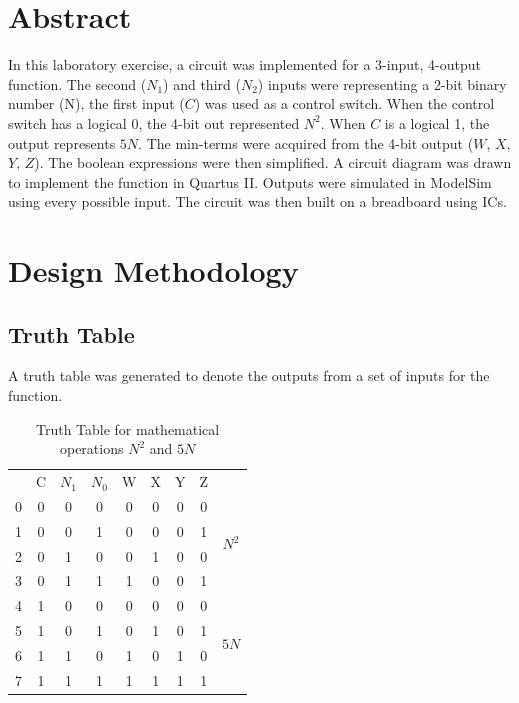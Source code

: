 \documentclass[CMPE]{KGCOEReport}
\begin{document}
\maketitle

\section*{Abstract}
In this laboratory exercise, a circuit was implemented for a 3-input, 4-output function. The second (\(N_1\)) and third (\(N_2\)) inputs were representing a 2-bit binary number (N), the first input (\(C\)) was used as a control switch. When the control switch has a logical 0, the 4-bit out represented \(N^2\). When \(C\) is a logical 1, the output represents \(5N\). The min-terms were acquired from the 4-bit output (\(W\), \(X\), \(Y\), \(Z\)). The boolean expressions were then simplified. A circuit diagram was drawn to implement the function in Quartus II. Outputs were simulated in ModelSim using every possible input. The circuit was then built on a breadboard using ICs.

\section*{Design Methodology}

\subsection*{Truth Table}

A truth table was generated to denote the outputs from a set of inputs for the function.

\begin{table}[h]
\renewcommand{\arraystretch}{1.2}
\setlength{\tabcolsep}{12pt}
\caption{Truth Table for mathematical operations \(N^2\) and \(5N\)}
\begin{center}
\begin{tabular}{c|c|c|c||c|c|c|c|c}
\cline{2-8}
& C & \(N_1\) & \(N_0\) & W & X & Y & Z & \\\cline{2-8}
{\scriptsize 0} & 0 & 0 & 0 & 0 & 0 & 0 & 0 & \multirow{4}{*}{\(N^2\)}\\\cline{2-8}
{\scriptsize 1} & 0 & 0 & 1 & 0 & 0 & 0 & 1\\\cline{2-8}
{\scriptsize 2} & 0 & 1 & 0 & 0 & 1 & 0 & 0\\\cline{2-8}
{\scriptsize 3} & 0 & 1 & 1 & 1 & 0 & 0 & 1\\\cline{2-9}
{\scriptsize 4} & 1 & 0 & 0 & 0 & 0 & 0 & 0 & \multirow{4}{*}{\(5N\)}\\\cline{2-8}
{\scriptsize 5} & 1 & 0 & 1 & 0 & 1 & 0 & 1\\\cline{2-8}
{\scriptsize 6} & 1 & 1 & 0 & 1 & 0 & 1 & 0\\\cline{2-8}
{\scriptsize 7} & 1 & 1 & 1 & 1 & 1 & 1 & 1\\\cline{2-8}

\end{tabular}
\end{center}
\label{tab:TRUTH}
\end{table}
\end{document}
